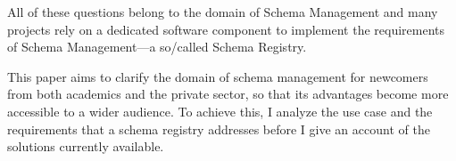 All of these questions belong to the domain of Schema Management and many projects rely on a dedicated software component to implement the requirements of Schema Management---a so\-/called Schema Registry.






This paper aims to clarify the domain of schema management for newcomers from both academics and the private sector, so that its advantages become more accessible to a wider audience. To achieve this, I analyze the use case and the requirements that a schema registry addresses before I give an account of the solutions currently available.

